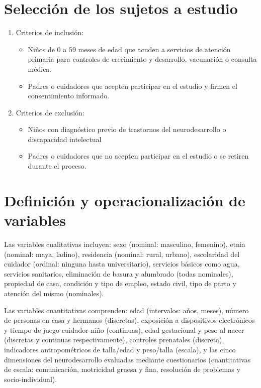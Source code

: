 \documentclass[11pt,letterpaper]{report}
\begin{document}
\section{Selección de los sujetos a estudio}
	\begin{enumerate}
		\item Criterios de inclusión:
			\begin{itemize}
				\item Niños de 0 a 59 meses de edad que acuden a servicios de
				atención primaria para controles de crecimiento y desarrollo,
				vacunación o consulta médica.
				\item Padres o cuidadores que acepten participar en el estudio
				y firmen el consentimiento informado.
			\end{itemize}
		\item Criterios de exclusión:
			\begin{itemize}
				\item Niños con diagnóstico previo de trastornos del
				neurodesarrollo o discapacidad intelectual
				\item Padres o cuidadores que no acepten participar en el
				estudio o se retiren durante el proceso.
			\end{itemize}
	\end{enumerate}

\section{Definición y operacionalización de variables}
Las variables cualitativas incluyen: sexo (nominal: masculino, femenino), etnia
(nominal: maya, ladino), residencia (nominal: rural, urbano), escolaridad del
cuidador (ordinal: ninguna hasta universitario), servicios básicos como agua,
servicios sanitarios, eliminación de basura y alumbrado (todas nominales),
propiedad de casa, condición y tipo de empleo, estado civil, tipo de parto y
atención del mismo (nominales).

Las variables cuantitativas comprenden: edad (intervalos: años, meses), número
de personas en casa y hermanos (discretas), exposición a dispositivos
electrónicos y tiempo de juego cuidador-niño (continuas), edad gestacional y
peso al nacer (discretas y continuas respectivamente), controles prenatales
(discreta), indicadores antropométricos de talla/edad y peso/talla (escala), y
las cinco dimensiones del neurodesarrollo evaluadas mediante cuestionarios
(cuantitativas de escala: comunicación, motricidad gruesa y fina, resolución de
problemas y socio-individual).
\end{document}
